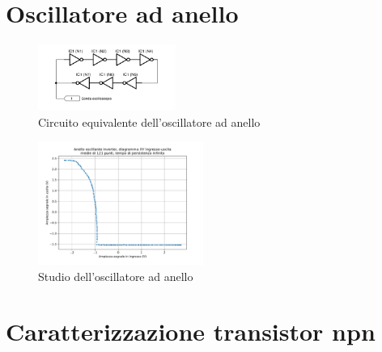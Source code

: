\documentclass[journal]{IEEEtran}
\begin{document}
\begin{appendices}

\section{Oscillatore ad anello}

\begin{figure}[H]%
\begin{center}
\includegraphics[width=0.40\textwidth]{sch-simulations/digital/output/ring-osc-logic.pdf}
\caption{Circuito equivalente dell'oscillatore ad anello}
\label{fig:circuit_ring_oscillator}
\end{center}
\end{figure}

\begin{figure}[H]%
\begin{center}
\includegraphics[width=0.48\textwidth]{analysis/output/inverter_ring_xy.pdf}
\caption{Studio dell'oscillatore ad anello}
\label{fig:inverter_ring_xy}
\end{center}
\end{figure}


\section{Caratterizzazione transistor npn}


\end{appendices}


\clearpage
\newpage

\tableofcontents %

\newpage

\printbibliography %
\end{document}
